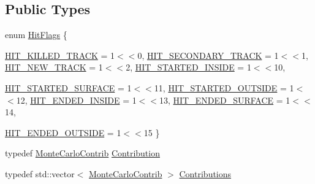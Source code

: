 \subsection*{Public Types}
\begin{DoxyCompactItemize}
\item 
enum \hyperlink{class_d_d4hep_1_1_simulation_1_1_geant4_hit_data_a2ae584db022f0919214459dffcaf41fc}{HitFlags} \{ \par
\hyperlink{class_d_d4hep_1_1_simulation_1_1_geant4_hit_data_a2ae584db022f0919214459dffcaf41fcaa17858fa257d170caa5b0699ec7ddfa5}{HIT\_\-KILLED\_\-TRACK} =  1$<$$<$0, 
\hyperlink{class_d_d4hep_1_1_simulation_1_1_geant4_hit_data_a2ae584db022f0919214459dffcaf41fca977f4bc3d591a19ac784671d9cc39d52}{HIT\_\-SECONDARY\_\-TRACK} =  1$<$$<$1, 
\hyperlink{class_d_d4hep_1_1_simulation_1_1_geant4_hit_data_a2ae584db022f0919214459dffcaf41fca3ef4c312d3f007a40c5fffb49841a2bf}{HIT\_\-NEW\_\-TRACK} =  1$<$$<$2, 
\hyperlink{class_d_d4hep_1_1_simulation_1_1_geant4_hit_data_a2ae584db022f0919214459dffcaf41fca1088e191ba77f3d839371a364940b011}{HIT\_\-STARTED\_\-INSIDE} =  1$<$$<$10, 
\par
\hyperlink{class_d_d4hep_1_1_simulation_1_1_geant4_hit_data_a2ae584db022f0919214459dffcaf41fca3eba160dfc155fb1883208e66583cc04}{HIT\_\-STARTED\_\-SURFACE} =  1$<$$<$11, 
\hyperlink{class_d_d4hep_1_1_simulation_1_1_geant4_hit_data_a2ae584db022f0919214459dffcaf41fcab3d9ded6a94e70ceba2c95de8a0f9b5c}{HIT\_\-STARTED\_\-OUTSIDE} =  1$<$$<$12, 
\hyperlink{class_d_d4hep_1_1_simulation_1_1_geant4_hit_data_a2ae584db022f0919214459dffcaf41fca4a055391a911e049b0056831ed5112c5}{HIT\_\-ENDED\_\-INSIDE} =  1$<$$<$13, 
\hyperlink{class_d_d4hep_1_1_simulation_1_1_geant4_hit_data_a2ae584db022f0919214459dffcaf41fca387b78da12a127cacf8ca7248e1e2f53}{HIT\_\-ENDED\_\-SURFACE} =  1$<$$<$14, 
\par
\hyperlink{class_d_d4hep_1_1_simulation_1_1_geant4_hit_data_a2ae584db022f0919214459dffcaf41fca41a83b74bf2428cc739f995928acf9d2}{HIT\_\-ENDED\_\-OUTSIDE} =  1$<$$<$15
 \}
\item 
typedef \hyperlink{class_d_d4hep_1_1_simulation_1_1_geant4_hit_data_1_1_monte_carlo_contrib}{MonteCarloContrib} \hyperlink{class_d_d4hep_1_1_simulation_1_1_geant4_hit_data_aec2f53237eac2db7d83dd03bca8719c5}{Contribution}
\item 
typedef std::vector$<$ \hyperlink{class_d_d4hep_1_1_simulation_1_1_geant4_hit_data_1_1_monte_carlo_contrib}{MonteCarloContrib} $>$ \hyperlink{class_d_d4hep_1_1_simulation_1_1_geant4_hit_data_aee3759a12612c2f2712e44f87e343a2f}{Contributions}
\end{DoxyCompactItemize}
